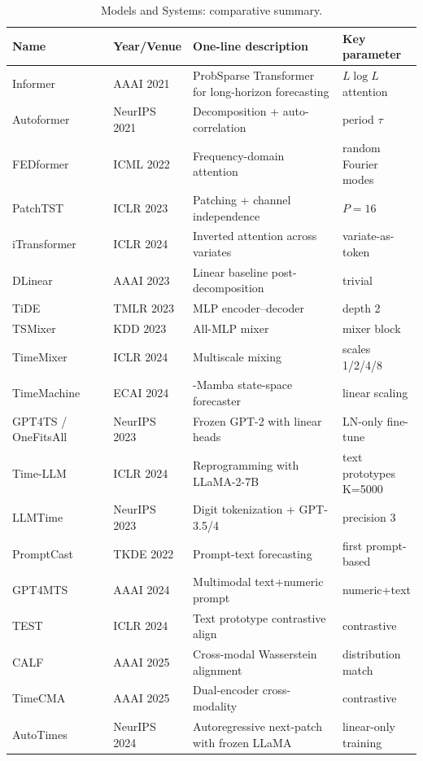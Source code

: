 \documentclass{article}
\begin{document}
\begin{table}[t]
\centering
\caption{Models and Systems: comparative summary.}
\label{tab:models-and-systems}
\begin{tabular}{>{\raggedright\arraybackslash}p{0.2677\linewidth}
  >{\raggedright\arraybackslash}p{0.1575\linewidth}
  >{\raggedright\arraybackslash}p{0.4016\linewidth}
  >{\raggedright\arraybackslash}p{0.1732\linewidth}}
\toprule
Name & Year/Venue & One-line description & Key parameter \\
\midrule
Informer & AAAI 2021 & ProbSparse Transformer for long-horizon forecasting & \(L \log L\) attention \\
Autoformer & NeurIPS 2021 & Decomposition + auto-correlation & period \(\tau\) \\
FEDformer & ICML 2022 & Frequency-domain attention & random Fourier modes \\
PatchTST & ICLR 2023 & Patching + channel independence & \(P=16\) \\
iTransformer & ICLR 2024 & Inverted attention across variates & variate-as-token \\
DLinear & AAAI 2023 & Linear baseline post-decomposition & trivial \\
TiDE & TMLR 2023 & MLP encoder--decoder & depth 2 \\
TSMixer & KDD 2023 & All-MLP mixer & mixer block \\
TimeMixer & ICLR 2024 & Multiscale mixing & scales 1/2/4/8 \\
TimeMachine & ECAI 2024 & 4-Mamba state-space forecaster & linear scaling \\
GPT4TS / OneFitsAll & NeurIPS 2023 & Frozen GPT-2 with linear heads & LN-only fine-tune \\
Time-LLM & ICLR 2024 & Reprogramming with LLaMA-2-7B & text prototypes K=5000 \\
LLMTime & NeurIPS 2023 & Digit tokenization + GPT-3.5/4 & precision 3 \\
PromptCast & TKDE 2022 & Prompt-text forecasting & first prompt-based \\
GPT4MTS & AAAI 2024 & Multimodal text+numeric prompt & numeric+text \\
TEST & ICLR 2024 & Text prototype contrastive align & contrastive \\
CALF & AAAI 2025 & Cross-modal Wasserstein alignment & distribution match \\
TimeCMA & AAAI 2025 & Dual-encoder cross-modality & contrastive \\
AutoTimes & NeurIPS 2024 & Autoregressive next-patch with frozen LLaMA & linear-only training \\

\end{tabular}
\end{table}
\end{document}
